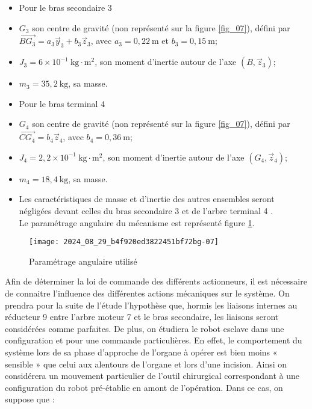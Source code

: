 \begin{itemize}
  \item Pour le bras secondaire 3
  \item $G_{3}$ son centre de gravité (non représenté sur la figure \ref{fig_07}), défini par $\overrightarrow{B G_{3}}=a_{3} \vec{y}_{3}+b_{3} \vec{z}_{3}$, avec $a_{3}=0,22 \mathrm{~m}$ et $b_{3}=0,15 \mathrm{~m}$;
  \item $J_{3}=6 \times 10^{-1} \mathrm{~kg} \cdot \mathrm{m}^{2}$, son moment d'inertie autour de l'axe $\left(B, \vec{z}_{3}\right)$;
  \item $m_{3}=35,2 \mathrm{~kg}$, sa masse.
  \item Pour le bras terminal 4
  \item $G_{4}$ son centre de gravité (non représenté sur la figure \ref{fig_07}), défini par $\overrightarrow{C G_{4}}=b_{4} \vec{z}_{4}$, avec $b_{4}=0,36 \mathrm{~m}$;
  \item $J_{4}=2,2 \times 10^{-1} \mathrm{~kg} \cdot \mathrm{m}^{2}$, son moment d'inertie autour de l'axe $\left(G_{4}, \vec{z}_{4}\right)$;
  \item $m_{4}=18,4 \mathrm{~kg}$, sa masse.
  \item Les caractéristiques de masse et d'inertie des autres ensembles seront négligées devant celles du bras secondaire 3 et de l'arbre terminal 4 .\\
Le paramétrage angulaire du mécanisme est représenté figure \ref{fig_08}.
\end{itemize}


\begin{figure}[!h]
\centering
\texttt{[image: 2024\_08\_29\_b4f920ed3822451bf72bg-07]}
\caption{\label{fig_08} Paramétrage angulaire utilisé}
\end{figure}

Afin de déterminer la loi de commande des différents actionneurs, il est nécessaire de connaitre l'influence des différentes actions mécaniques sur le système. On prendra pour la suite de l'étude l'hypothèse que, hormis les liaisons internes au réducteur 9 entre l'arbre moteur 7 et le bras secondaire, les liaisons seront considérées comme parfaites. De plus, on étudiera le robot esclave dans une configuration et pour une commande particulières. En effet, le comportement du système lors de sa phase d'approche de l'organe à opérer est bien moins « sensible » que celui aux alentours de l'organe et lors d'une incision. Ainsi on considérera un mouvement particulier de l'outil chirurgical correspondant à une configuration du robot pré-établie en amont de l'opération. Dans ce cas, on suppose que :

